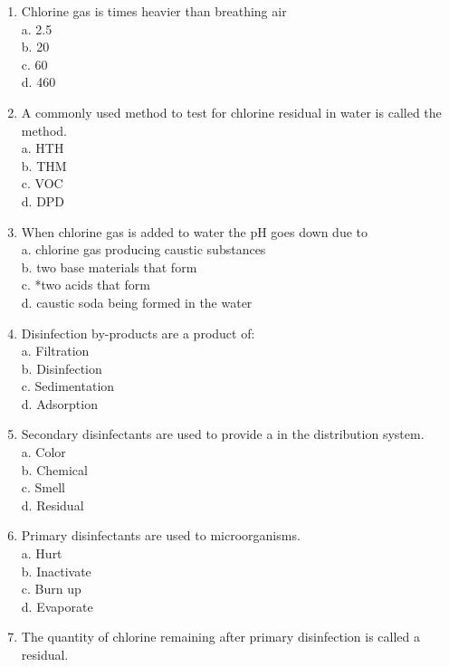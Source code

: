 \begin{enumerate}[1.]
\item Chlorine gas is times heavier than breathing air\\
a. 2.5\\
b. 20\\
c. 60\\
d. 460\\
\item A commonly used method to test for chlorine residual in water is called the method.\\
a. HTH\\
b. THM\\
c. VOC\\
d. DPD\\
\item When chlorine gas is added to water the $\mathrm{pH}$ goes down due to\\
a. chlorine gas producing caustic substances\\
b. two base materials that form\\
c. *two acids that form\\
d. caustic soda being formed in the water\\
\item Disinfection by-products are a product of:\\
a. Filtration\\
b. Disinfection\\
c. Sedimentation\\
d. Adsorption\\
\item Secondary disinfectants are used to provide a in the distribution system.\\
a. Color\\
b. Chemical\\
c. Smell\\
d. Residual\\
\item Primary disinfectants are used to microorganisms.\\
a. Hurt\\
b. Inactivate\\
c. Burn up\\
d. Evaporate\\
\item The quantity of chlorine remaining after primary disinfection is called a residual.\\

\end{enumerate}

